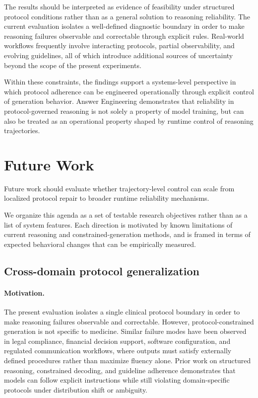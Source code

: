 \documentclass[twocolumn]{article}
\begin{document}
The results should be interpreted as evidence of feasibility under structured
protocol conditions rather than as a general solution to reasoning reliability.
The current evaluation isolates a well-defined diagnostic boundary in order to
make reasoning failures observable and correctable through explicit rules.
Real-world workflows frequently involve interacting protocols, partial
observability, and evolving guidelines, all of which introduce additional
sources of uncertainty beyond the scope of the present experiments.

Within these constraints, the findings support a systems-level perspective in
which protocol adherence can be engineered operationally through explicit
control of generation behavior. Answer Engineering demonstrates that reliability
in protocol-governed reasoning is not solely a property of model training, but
can also be treated as an operational property shaped by runtime control of
reasoning trajectories.

\section{Future Work}

Future work should evaluate whether trajectory-level control can scale from
localized protocol repair to broader runtime reliability mechanisms.

We organize this agenda as a set of testable research objectives rather than as
a list of system features. Each direction is motivated by known limitations of
current reasoning and constrained-generation methods, and is framed in terms of
expected behavioral changes that can be empirically measured.

\subsection{Cross-domain protocol generalization}

\paragraph{Motivation.}
The present evaluation isolates a single clinical protocol boundary in order to
make reasoning failures observable and correctable. However,
protocol-constrained generation is not specific to medicine. Similar failure
modes have been observed in legal compliance, financial decision support,
software configuration, and regulated communication workflows, where outputs
must satisfy externally defined procedures rather than maximize fluency alone.
Prior work on structured reasoning, constrained decoding, and guideline
adherence demonstrates that models can follow explicit instructions while still
violating domain-specific protocols under distribution shift or ambiguity.
\end{document}
